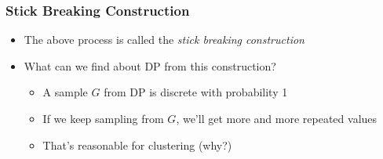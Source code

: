 \documentclass{beamer}
\begin{document}
\begin{frame}
	\frametitle{Stick Breaking Construction}
	\begin{itemize}
		\item The above process is called the {\em stick breaking construction}
		\item What can we find about DP from this construction?
		\begin{itemize}
		\pause
		\item A sample $G$ from DP is {\color{red}discrete} with probability 1
		\pause
		\item If we keep sampling from $G$, we'll get more and more {\color{red}repeated} values
		\pause
		\item That's reasonable for clustering (why?)
		\end{itemize}
	\end{itemize}
\end{frame}
\end{document}
